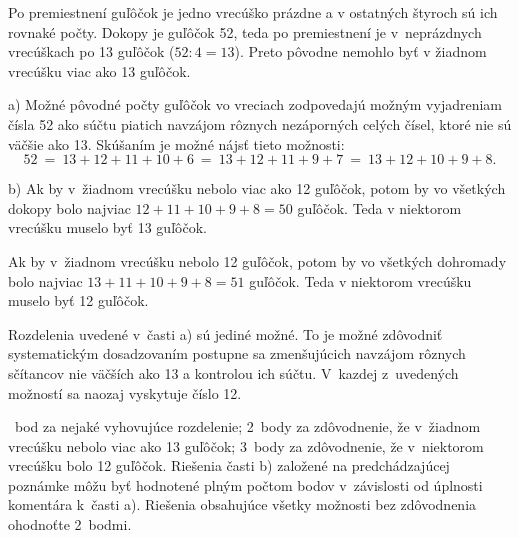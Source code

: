 {%
Po premiestnení guľôčok je jedno vrecúško prázdne a v ostatných štyroch sú ich rovnaké počty.
Dokopy je guľôčok 52, teda po premiestnení je v~neprázdnych vrecúškach po 13 guľôčok ($52:4=13$).
Preto pôvodne nemohlo byť v žiadnom vrecúšku viac ako 13 guľôčok.

\smallskip
a)
Možné pôvodné počty guľôčok vo vreciach zodpovedajú možným vyjadreniam čísla 52 ako súčtu piatich navzájom rôznych nezáporných celých čísel, ktoré nie sú väčšie ako 13.
Skúšaním je možné nájsť tieto možnosti:
$$
52\ =\
13+12+11+10+6\ =\
13+12+11+9+7\ =\
13+12+10+9+8.
$$

\smallskip
b)
Ak by v~žiadnom vrecúšku nebolo viac ako 12 guľôčok, potom by vo všetkých dokopy bolo najviac $12+11+10+9+8=50$ guľôčok.
Teda v niektorom vrecúšku muselo byť 13 guľôčok.

Ak by v~žiadnom vrecúšku nebolo 12 guľôčok, potom by vo všetkých dohromady bolo najviac $13+11+10+9+8=51$ guľôčok.
Teda v niektorom vrecúšku muselo byť 12 guľôčok.


\poznamka
Rozdelenia uvedené v~časti a) sú jediné možné.
To je možné zdôvodniť systematickým dosadzovaním postupne sa zmenšujúcich navzájom rôznych sčítancov nie väčších ako 13 a kontrolou ich súčtu.
V~kazdej z~uvedených možností sa naozaj vyskytuje číslo 12.

\hodnotenie
1~bod za nejaké vyhovujúce rozdelenie;
2~body za zdôvodnenie, že v~žiadnom vrecúšku nebolo viac ako 13 guľôčok;
3~body za zdôvodnenie, že v~niektorom vrecúšku bolo 12 guľôčok.
Riešenia časti b) založené na predchádzajúcej poznámke môžu byť hodnotené plným počtom bodov v~závislosti od úplnosti komentára k~časti a).
Riešenia obsahujúce všetky možnosti bez zdôvodnenia ohodnoťte 2~bodmi.
\endhodnotenie}

